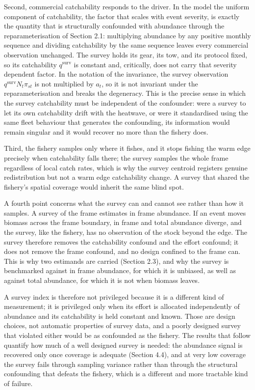 \documentclass[
  11pt,
  a4paper,
]{article}
\begin{document}
Second, commercial catchability responds to the driver. In the model the
uniform component of catchability, the factor that scales with event
severity, is exactly the quantity that is structurally confounded with
abundance through the reparameterisation of Section 2.1: multiplying
abundance by any positive monthly sequence and dividing catchability by
the same sequence leaves every commercial observation unchanged. The
survey holds its gear, its tow, and its protocol fixed, so its
catchability \(q^{\text{surv}}\) is constant and, critically, does not
carry that severity dependent factor. In the notation of the invariance,
the survey observation \(q^{\text{surv}} N_t \pi_{st}\) is not
multiplied by \(a_t\), so it is not invariant under the
reparameterisation and breaks the degeneracy. This is the precise sense
in which the survey catchability must be independent of the confounder:
were a survey to let its own catchability drift with the heatwave, or
were it standardised using the same fleet behaviour that generates the
confounding, its information would remain singular and it would recover
no more than the fishery does.

Third, the fishery samples only where it fishes, and it stops fishing
the warm edge precisely when catchability falls there; the survey
samples the whole frame regardless of local catch rates, which is why
the survey centroid registers genuine redistribution but not a warm edge
catchability change. A survey that shared the fishery's spatial coverage
would inherit the same blind spot.

A fourth point concerns what the survey can and cannot see rather than
how it samples. A survey of the frame estimates in frame abundance. If
an event moves biomass across the frame boundary, in frame and total
abundance diverge, and the survey, like the fishery, has no observation
of the stock beyond the edge. The survey therefore removes the
catchability confound and the effort confound; it does not remove the
frame confound, and no design confined to the frame can. This is why two
estimands are carried (Section 2.3), and why the survey is benchmarked
against in frame abundance, for which it is unbiased, as well as against
total abundance, for which it is not when biomass leaves.

A survey index is therefore not privileged because it is a different
kind of measurement; it is privileged only when its effort is allocated
independently of abundance and its catchability is held constant and
known. Those are design choices, not automatic properties of survey
data, and a poorly designed survey that violated either would be as
confounded as the fishery. The results that follow quantify how much of
a well designed survey is needed: the abundance signal is recovered only
once coverage is adequate (Section 4.4), and at very low coverage the
survey fails through sampling variance rather than through the
structural confounding that defeats the fishery, which is a different
and more tractable kind of failure.
\end{document}
